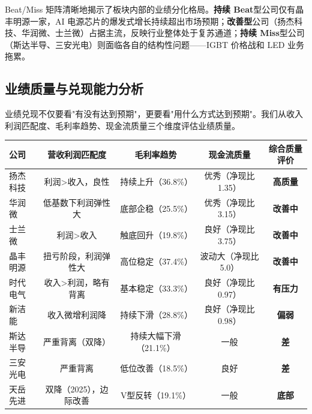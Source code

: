 Beat/Miss 矩阵清晰地揭示了板块内部的业绩分化格局。\textbf{持续 Beat}型公司仅有晶丰明源一家，AI 电源芯片的爆发式增长持续超出市场预期；\textbf{改善型}公司（扬杰科技、华润微、士兰微）占据主流，反映行业整体处于复苏通道；\textbf{持续 Miss}型公司（斯达半导、三安光电）则面临各自的结构性问题——IGBT 价格战和 LED 业务拖累。

\subsection{业绩质量与兑现能力分析}

业绩兑现不仅要看"有没有达到预期"，更要看"用什么方式达到预期"。我们从收入利润匹配度、毛利率趋势、现金流质量三个维度评估业绩质量。

\begin{exhibitbox}[表 7-7：业绩质量多维度对比]
\centering
\small
\begin{tabularx}{\textwidth}{l c c c c}
\toprule
\textbf{公司} & \textbf{营收利润匹配度} & \textbf{毛利率趋势} & \textbf{现金流质量} & \textbf{综合质量评价} \\
\midrule
\rowcolor{riskgreen!10}
扬杰科技 & 利润>收入，良性 & 持续上升（36.8\%） & 优秀（净现比 1.35） & \textbf{高质量} \\
\rowcolor{riskgreen!10}
华润微 & 低基数下利润弹性大 & 底部企稳（25.5\%） & 优秀（净现比 3.15） & \textbf{改善中} \\
\rowcolor{riskamber!10}
士兰微 & 利润>收入 & 触底回升（19.8\%） & 良好（净现比 3.75） & \textbf{改善中} \\
\rowcolor{riskamber!10}
晶丰明源 & 扭亏阶段，利润弹性大 & 高位稳定（37.4\%） & 波动大（净现比 5.0） & \textbf{改善中} \\
\rowcolor{riskamber!10}
时代电气 & 收入>利润，略有背离 & 基本稳定（33.3\%） & 良好（净现比 0.97） & \textbf{有压力} \\
\rowcolor{riskred!10}
新洁能 & 收入微增利润降 & 持续下滑（28.8\%） & 良好（净现比 0.98） & \textbf{偏弱} \\
\rowcolor{riskred!10}
斯达半导 & 严重背离（双降） & 持续大幅下滑（21.1\%） & 一般 & \textbf{差} \\
\rowcolor{riskred!10}
三安光电 & 严重背离 & 低位改善（18.5\%） & 良好 & \textbf{差} \\
\rowcolor{riskred!10}
天岳先进 & 双降（2025），边际改善 & V型反转（19.1\%） & 一般 & \textbf{底部} \\
\bottomrule
\end{tabularx}
\end{exhibitbox}

